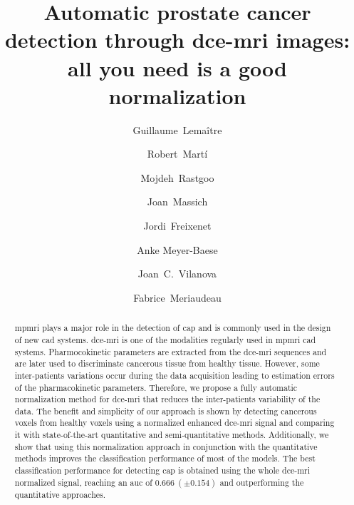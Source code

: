 \documentclass[review]{elsarticle}
\begin{document}
\begin{frontmatter}

\title{Automatic prostate cancer detection through \acs*{dce}-\acs*{mri} images: all you need is a good normalization}

\author[label7]{Guillaume~Lema\^itre}
\author[label3]{Robert~Mart\'i}
\author[label1]{Mojdeh~Rastgoo}
\author[label1]{Joan~Massich}
\author[label3]{Jordi~Freixenet}
\author[label5]{Anke Meyer-Baese}
\author[label4]{Joan~C.~Vilanova}
\author[label1,label6]{Fabrice~Meriaudeau}
\address[label7]{Parietal team, Inria, CEA, Universit\'e Paris-Saclay,
  1 Rue Honor\'e d'Estienne d'Orves, 91120 Palaiseau, France}
\address[label1]{\scriptsize LE2I UMR6306, CNRS, Arts et M\'etiers, Univ. Bourgogne Franche-Comt\'e, 12 rue de la Fonderie, 71200 Le Creusot, France}
\address[label3]{\scriptsize ViCOROB, Universitat de Girona, Campus Montilivi, Edifici P4, 17071 Girona, Spain}
\address[label4]{\scriptsize Department of Magnetic Resonance, Cl\'inica Girona, Lorenzana 36, 17002 Girona, Spain}
\address[label5]{\scriptsize Department of Scientific Computing, 400 Dirac Science Library, Florida State University, Tallahassee, FL 32306, United States}
\address[label6]{\scriptsize CISIR, Electrical \& Electronic Engineering Department, Universiti Teknologi Petronas, 32610 Seri Iskandar, Perak, Malaysia}

\begin{abstract}
\Ac{mpmri} plays a major role in the detection of \ac{cap} and is commonly used in the design of new \ac{cad} systems.
\ac{dce}-\ac{mri} is one of the modalities regularly used in \ac{mpmri} \ac{cad} systems.
Pharmocokinetic parameters are extracted from the \ac{dce}-\ac{mri}
sequences and are later used to discriminate cancerous tissue from healthy tissue.
However, some inter-patients variations occur during the data acquisition leading to estimation errors of the pharmacokinetic parameters.
Therefore, we propose a fully automatic normalization method for \ac{dce}-\ac{mri} that reduces the inter-patients variability of the data.
The benefit and simplicity of our approach is shown by detecting
cancerous voxels from healthy voxels using a normalized enhanced
\ac{dce}-\ac{mri} signal and comparing it with state-of-the-art quantitative and semi-quantitative methods.
Additionally, we show that using this normalization approach in conjunction with the quantitative methods improves the classification performance of most of the models.
The best classification performance for detecting \ac{cap} is obtained using the whole \ac{dce}-\ac{mri} normalized signal, reaching an \ac{auc} of $0.666\ (\pm 0.154)$ and outperforming the quantitative approaches.
\end{abstract}


\end{frontmatter}
\end{document}
